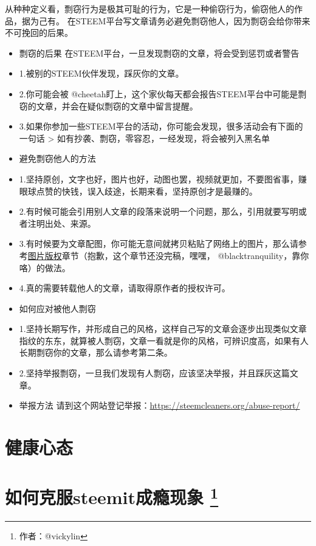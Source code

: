 \documentclass[]{ctexbook}
\begin{document}
从种种定义看，剽窃行为是极其可耻的行为，它是一种偷窃行为，偷窃他人的作品，据为己有。
在STEEM平台写文章请务必避免剽窃他人，因为剽窃会给你带来不可挽回的后果。

\begin{itemize}
\item
  剽窃的后果
  在STEEM平台，一旦发现剽窃的文章，将会受到惩罚或者警告
\item
  1.被别的STEEM伙伴发现，踩灰你的文章。
\item
  2.你可能会被 @cheetah盯上，这个家伙每天都会报告STEEM平台中可能是剽窃的文章，并会在疑似剽窃的文章中留言提醒。
\item
  3.如果你参加一些STEEM平台的活动，你可能会发现，很多活动会有下面的一句话
  \textgreater{} 如有抄袭、剽窃，零容忍，一经发现，将会被列入黑名单
\item
  避免剽窃他人的方法
\item
  1.坚持原创，文字也好，图片也好，动图也罢，视频就更加，不要图省事，赚眼球点赞的快钱，误入歧途，长期来看，坚持原创才是最赚的。
\item
  2.有时候可能会引用别人文章的段落来说明一个问题，那么，引用就要写明或者注明出处、来源。
\item
  3.有时候要为文章配图，你可能无意间就拷贝粘贴了网络上的图片，那么请参考\protect\hyperlink{tpbq}{图片版权}章节（抱歉，这个章节还没完稿，嘿嘿， @blacktranquility，靠你咯）的做法。
\item
  4.真的需要转载他人的文章，请取得原作者的授权许可。
\item
  如何应对被他人剽窃
\item
  1.坚持长期写作，并形成自己的风格，这样自己写的文章会逐步出现类似文章指纹的东东，就算被人剽窃，文章一看就是你的风格，可辨识度高，如果有人长期剽窃你的文章，那么请参考第二条。
\item
  2.坚持举报剽窃，一旦我们发现有人剽窃，应该坚决举报，并且踩灰这篇文章。
\item
  举报方法
  请到这个网站登记举报：\url{https://steemcleaners.org/abuse-report/}
\end{itemize}

\hypertarget{jkxt}{%
\section{健康心态}\label{jkxt}}

\hypertarget{steemit}{%
\section[如何克服steemit成瘾现象 ]{\texorpdfstring{如何克服steemit成瘾现象 \footnote{作者：@vickylin}}{如何克服steemit成瘾现象 }}\label{steemit}}
\end{document}
